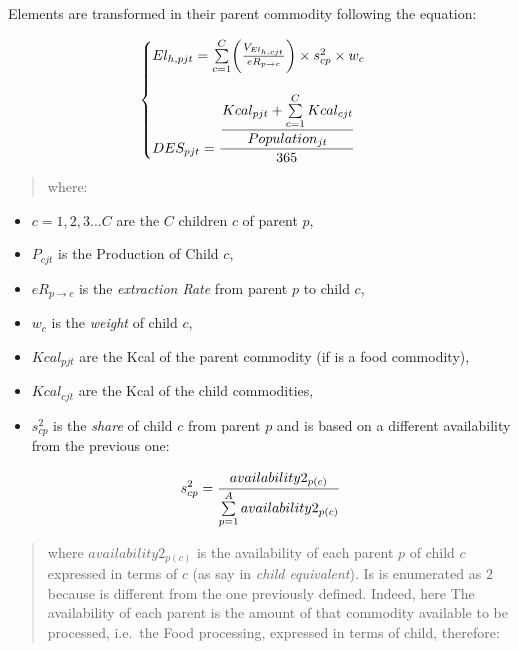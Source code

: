 \documentclass[]{article}
\providecommand{\tightlist}{%
  \setlength{\itemsep}{0pt}\setlength{\parskip}{0pt}}
\begin{document}
Elements are transformed in their parent commodity following the
equation:

\begin{equation}
\begin{cases}
\label{eq:Food Processing}
 El_{h,pjt} = \sum \limits_{c=1}^C\biggl(\frac{V_{El_{h,cjt}}}{eR_{p\to c}}\biggr)\times s^{2}_{cp}\times w_{c}\\
  \\
 DES_{pjt} =  \cfrac{\cfrac{Kcal_{pjt} + \sum \limits_{c=1}^C Kcal_{cjt}}{Population_{jt}}}{365}
\end{cases}
\end{equation}

\begin{quote}
where:
\end{quote}

\begin{itemize}
\tightlist
\item
  \(c = 1,2,3...C\) are the \(C\) children \(c\) of parent \(p\),
\item
  \(P_{cjt}\) is the Production of Child \(c\),
\item
  \(eR_{p\to c}\) is the \emph{extraction Rate} from parent \(p\) to
  child \(c\),
\item
  \(w_{c}\) is the \emph{weight} of child \(c\),
\item
  \(Kcal_{pjt}\) are the Kcal of the parent commodity (if is a food
  commodity),
\item
  \(Kcal_{cjt}\) are the Kcal of the child commodities,
\item
  \(s^{2}_{cp}\) is the \emph{share} of child \(c\) from parent \(p\)
  and is based on a different availability from the previous one:
\end{itemize}

\begin{equation}
\label{eq:shares}
s^{2}_{cp} = \cfrac{availability2_{p(c)}}{\sum \limits_{p=1}^A{availability2_{p(c)}}}
\end{equation}

\begin{quote}
where \(availability2_{p(c)}\) is the availability of each parent \(p\)
of child \(c\) expressed in terms of \(c\) (as say in \emph{child
equivalent}). Is is enumerated as \(2\) because is different from the
one previously defined. Indeed, here The availability of each parent is
the amount of that commodity available to be processed, i.e.~the Food
processing, expressed in terms of child, therefore:
\end{quote}
\end{document}
